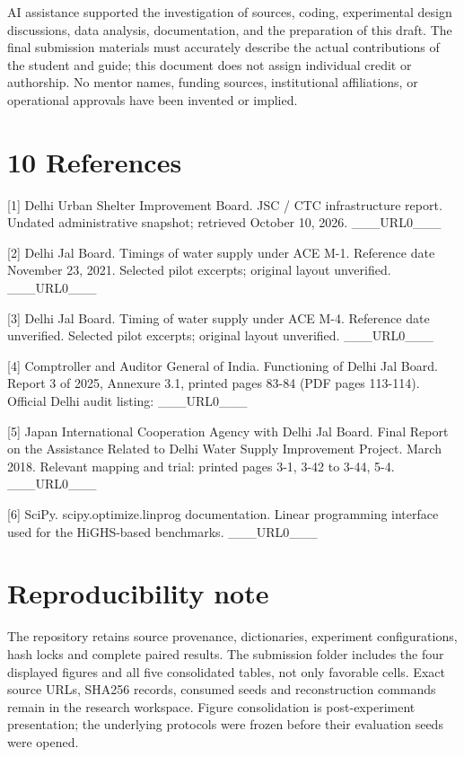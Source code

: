\documentclass[conference]{IEEEtran}
\begin{document}
AI assistance supported the investigation of sources, coding, experimental design discussions, data analysis, documentation, and the preparation of this draft. The final submission materials must accurately describe the actual contributions of the student and guide; this document does not assign individual credit or authorship. No mentor names, funding sources, institutional affiliations, or operational approvals have been invented or implied.

\section{10 References}
[1] Delhi Urban Shelter Improvement Board. JSC / CTC infrastructure report. Undated administrative snapshot; retrieved October 10, 2026. \_\_\_URL0\_\_\_

[2] Delhi Jal Board. Timings of water supply under ACE M-1. Reference date November 23, 2021. Selected pilot excerpts; original layout unverified. \_\_\_URL0\_\_\_

[3] Delhi Jal Board. Timing of water supply under ACE M-4. Reference date unverified. Selected pilot excerpts; original layout unverified. \_\_\_URL0\_\_\_

[4] Comptroller and Auditor General of India. Functioning of Delhi Jal Board. Report 3 of 2025, Annexure 3.1, printed pages 83-84 (PDF pages 113-114). Official Delhi audit listing: \_\_\_URL0\_\_\_

[5] Japan International Cooperation Agency with Delhi Jal Board. Final Report on the Assistance Related to Delhi Water Supply Improvement Project. March 2018. Relevant mapping and trial: printed pages 3-1, 3-42 to 3-44, 5-4. \_\_\_URL0\_\_\_

[6] SciPy. scipy.optimize.linprog documentation. Linear programming interface used for the HiGHS-based benchmarks. \_\_\_URL0\_\_\_

\section{Reproducibility note}
The repository retains source provenance, dictionaries, experiment configurations, hash locks and complete paired results. The submission folder includes the four displayed figures and all five consolidated tables, not only favorable cells. Exact source URLs, SHA256 records, consumed seeds and reconstruction commands remain in the research workspace. Figure consolidation is post-experiment presentation; the underlying protocols were frozen before their evaluation seeds were opened.
\end{document}
